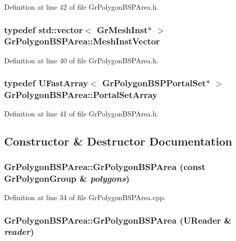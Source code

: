 Definition at line 42 of file GrPolygonBSPArea.h.\hypertarget{class_gr_polygon_b_s_p_area_b824c31e82278ab2ad80a6401a6e3847}{
\subsubsection[{MeshInstVector}]{\setlength{\rightskip}{0pt plus 5cm}typedef std::vector$<$ {\bf GrMeshInst}$\ast$ $>$ {\bf GrPolygonBSPArea::MeshInstVector}}}
\label{class_gr_polygon_b_s_p_area_b824c31e82278ab2ad80a6401a6e3847}




Definition at line 40 of file GrPolygonBSPArea.h.\hypertarget{class_gr_polygon_b_s_p_area_685afa93a012b1cfa2aba2ed063116b1}{
\subsubsection[{PortalSetArray}]{\setlength{\rightskip}{0pt plus 5cm}typedef {\bf UFastArray}$<$ {\bf GrPolygonBSPPortalSet}$\ast$ $>$ {\bf GrPolygonBSPArea::PortalSetArray}}}
\label{class_gr_polygon_b_s_p_area_685afa93a012b1cfa2aba2ed063116b1}




Definition at line 41 of file GrPolygonBSPArea.h.

\subsection{Constructor \& Destructor Documentation}
\hypertarget{class_gr_polygon_b_s_p_area_9fdd7b9d43647ca566f1c00b20fc11ba}{
\subsubsection[{GrPolygonBSPArea}]{\setlength{\rightskip}{0pt plus 5cm}GrPolygonBSPArea::GrPolygonBSPArea (const {\bf GrPolygonGroup} \& {\em polygons})}}
\label{class_gr_polygon_b_s_p_area_9fdd7b9d43647ca566f1c00b20fc11ba}




Definition at line 34 of file GrPolygonBSPArea.cpp.\hypertarget{class_gr_polygon_b_s_p_area_c7e3331609edd245efdba8ef8b7e8cc4}{
\subsubsection[{GrPolygonBSPArea}]{\setlength{\rightskip}{0pt plus 5cm}GrPolygonBSPArea::GrPolygonBSPArea ({\bf UReader} \& {\em reader})}}
\label{class_gr_polygon_b_s_p_area_c7e3331609edd245efdba8ef8b7e8cc4}




